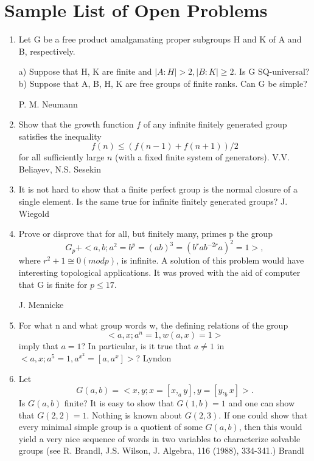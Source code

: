 
\appendix

\chapter{Sample List of Open Problems}
\label{problems}

\begin{enumerate}
\item	Let G be a free product amalgamating proper subgroups H and K of 
A and B, respectively.

\noindent a) Suppose that H, K are finite and
$\mid A:H\mid > 2, \mid B:K\mid \geq 2$.                 
Is G  SQ-universal?
\noindent
		b)	Suppose that A, B, H, K are free groups of
finite ranks.  Can G be simple?

\medskip\noindent
P. M. Neumann


\item Show that the growth function $f$ of any infinite finitely 
generated group satisfies the inequality
$$f(n) \leq (f(n-1)+f(n+1))/2 $$
for all sufficiently large $n$ (with a fixed finite system of generators).
\medskip\noindent
V.V. Beliayev, N.S. Sesekin

\item	  It is not hard to show that a finite perfect group is 
the normal closure of a single element.  Is the  
same true for infinite finitely generated groups?
\medskip\noindent
J. Wiegold
\item
Prove or disprove that for all, but finitely many, primes p the group
$$G_p+<a,b;a^2=b^p=(ab)^3=(b^rab^{-2r}a)^2=1>,$$
where $r^2+1\cong 0 (mod p)$, is infinite. A solution of this problem 
would have interesting topological  
applications.  It was proved with the aid of computer that G 
is finite for   $p \leq 17$.

\medskip\noindent
J. Mennicke

\item
For what n and what group words w, the defining relations of the group
$$<a,x;a^n=1, w(a,x)=1>$$
imply that $a=1$? In particular, is it true that $a \neq 1$ in 
$<a,x; a^5=1, a^{x^2}=[a,a^x]>$?                                          
\medskip\noindent
Lyndon
\item
Let  
$$G(a,b)=<x,y;x=[x,_ay], y=[y,_bx]>.$$
Is $G(a,b)$ finite?  It is easy to show that
$G(1,b)=1$ and one can show that
$G(2,2)=1$. Nothing is known about  $G(2,3)$.  
If one could show that every minimal simple  
group is a quotient of some $G(a,b)$, then this would yield a 
very nice sequence of words in two variables  
to characterize solvable groups (see R. Brandl, J.S. Wilson, 
J. Algebra, 116 (1988), 334-341.)
\medskip\noindent
 Brandl


\end{enumerate}
